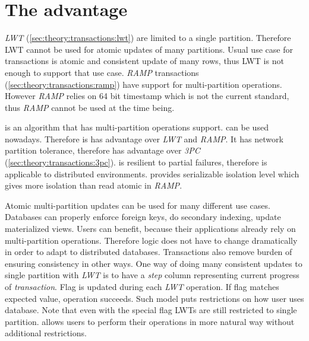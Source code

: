 
\section{The advantage}
\emph{LWT} (\ref{sec:theory:transactions:lwt}) are limited to a single partition. Therefore LWT cannot be used for atomic updates of many partitions. Usual use case for transactions is atomic and consistent update of many rows, thus LWT is not enough to support that use case. \emph{RAMP} transactions (\ref{sec:theory:transactions:ramp}) have support for multi-partition operations. 
However \emph{RAMP} relies on 64 bit timestamp which is not the current standard, thus \emph{RAMP} cannot be used at the time being.

\mpp is an algorithm that has multi-partition operations support. \mpp can be used nowadays. Therefore is has advantage over \emph{LWT} and \emph{RAMP}. It has network partition tolerance, therefore has advantage over \emph{3PC} (\ref{sec:theory:transactions:3pc}).
\mpp is resilient to partial failures, therefore is applicable to distributed environments. \mpp provides serializable isolation level which gives more isolation than read atomic in \emph{RAMP}.

Atomic multi-partition updates can be used for many different use cases. Databases can properly enforce foreign keys, do secondary indexing, update materialized views. Users can benefit, because their applications already rely on multi-partition operations. Therefore logic does not have to change dramatically in order to adapt to distributed databases. Transactions also remove burden of ensuring consistency in other ways. One way of doing many consistent updates to single partition with \emph{LWT} is to have a \emph{step} column representing current progress of \emph{transaction}. Flag is updated during each \emph{LWT} operation. If flag matches expected value, operation succeeds. Such model puts restrictions on how user uses database. Note that even with the special flag LWTs are still restricted to single partition. \mpp allows users to perform their operations in more natural way without additional restrictions. 
